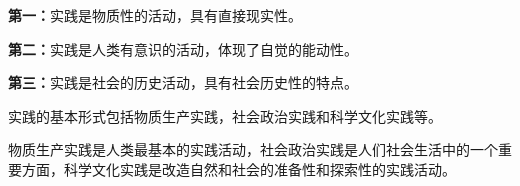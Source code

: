 \textbf{第一：}实践是物质性的活动，具有直接现实性。

\textbf{第二：}实践是人类有意识的活动，体现了自觉的能动性。

\textbf{第三：}实践是社会的历史活动，具有社会历史性的特点。

{实践的基本形式包括物质生产实践，社会政治实践和科学文化实践等。}

物质生产实践是人类最基本的实践活动，社会政治实践是人们社会生活中的一个重要方面，科学文化实践是改造自然和社会的准备性和探索性的实践活动。~~~
